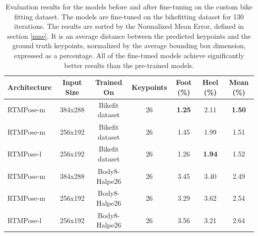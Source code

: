 \begin{table}[htb]
    \setlength{\tabcolsep}{4pt}
    \centering
    \begin{tabular}{l cccccc}
        \toprule
        Architecture & Input Size & Trained On      & Keypoints & Foot (\%)     & Heel (\%)     & Mean (\%)     \\
        \midrule
        RTMPose-m    & 384x288    & Bikefit dataset & 26        & \textbf{1.25} & 2.11          & \textbf{1.50} \\
        RTMPose-m    & 256x192    & Bikefit dataset & 26        & 1.45          & 1.99          & 1.51          \\
        RTMPose-l    & 256x192    & Bikefit dataset & 26        & 1.26          & \textbf{1.94} & 1.52          \\
        RTMPose-m    & 384x288    & Body8-Halpe26   & 26        & 3.45          & 3.40          & 2.49          \\
        RTMPose-m    & 256x192    & Body8-Halpe26   & 26        & 3.29          & 3.62          & 2.54          \\
        RTMPose-l    & 256x192    & Body8-Halpe26   & 26        & 3.56          & 3.21          & 2.64          \\
        \bottomrule
    \end{tabular}
    \caption{Evaluation results for the models before and after fine-tuning on the custom bike fitting dataset. The models are fine-tuned on the bikefitting dataset for 130 iterations. The results are sorted by the Normalized Mean Error, defined in section \ref{nme}. It is an average distance between the predicted keypoints and the ground truth keypoints, normalized by the average bounding box dimension, expressed as a percentage. All of the fine-tuned models achieve significantly better results than the pre-trained models.}
    \label{tab:finetune_results}

\end{table}

